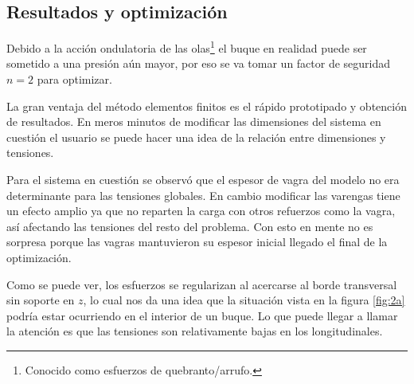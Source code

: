 \documentclass[onecolumn,10pt,titlepage]{article}
\begin{document}
\subsection{Resultados y optimización}
Debido a la acción ondulatoria de las olas\footnote{Conocido como esfuerzos de quebranto/arrufo.} el buque en realidad puede ser sometido a una presión aún mayor, por eso se va tomar un factor de seguridad $n=2$ para optimizar.

La gran ventaja del método elementos finitos es el rápido prototipado y obtención de resultados. En meros minutos de modificar las dimensiones del sistema en cuestión el usuario se puede hacer una idea de la relación entre dimensiones y tensiones.

Para el sistema en cuestión se observó que el espesor de vagra del modelo no era determinante para las tensiones globales. En cambio modificar las varengas tiene un efecto amplio ya que no reparten la carga con otros refuerzos como la vagra, así afectando las tensiones del resto del problema. Con esto en mente no es sorpresa porque las vagras mantuvieron su espesor inicial llegado el final de la optimización.

Como se puede ver, los esfuerzos se regularizan al acercarse al borde transversal sin soporte en $z$, lo cual nos da una idea que la situación vista en la figura \ref{fig:2a} podría estar ocurriendo en el interior de un buque. Lo que puede llegar a llamar la atención es que las tensiones son relativamente bajas en los longitudinales.
\end{document}
